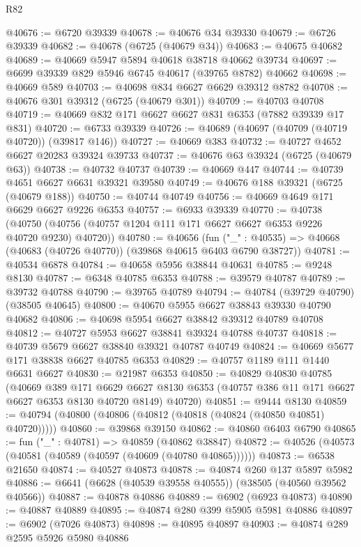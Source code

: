 \begin{lexlean}{R82}
\begin{coremodule}
@40676 := @6720 @39339
@40678 := @40676 @34 @39330
@40679 := @6726 @39339
@40682 := @40678 (@6725 (@40679 @34))
@40683 := @40675 @40682
@40689 := @40669 @5947 @5894 @40618 @38718 @40662 @39734
@40697 := @6699 @39339 @829 @5946 @6745 @40617 (@39765 @8782) @40662
@40698 := @40669 @589
@40703 := @40698 @834 @6627 @6629 @39312 @8782
@40708 := @40676 @301 @39312 (@6725 (@40679 @301))
@40709 := @40703 @40708
@40719 := @40669 @832 @171 @6627 @6627 @831 @6353 (@7882 @39339 @17 @831)
@40720 := @6733 @39339
@40726 := @40689 (@40697 (@40709 (@40719 @40720)) (@39817 @146))
@40727 := @40669 @383
@40732 := @40727 @4652 @6627 @20283 @39324 @39733
@40737 := @40676 @63 @39324 (@6725 (@40679 @63))
@40738 := @40732 @40737
@40739 := @40669 @447
@40744 := @40739 @4651 @6627 @6631 @39321 @39580
@40749 := @40676 @188 @39321 (@6725 (@40679 @188))
@40750 := @40744 @40749
@40756 := @40669 @4649 @171 @6629 @6627 @9226 @6353
@40757 := @6933 @39339
@40770 := @40738
    (@40750 (@40756 (@40757 @1204 @111 @171 @6627 @6627 @6353 @9226 @40720 @9230) @40720))
@40780 := @40656
    (fun ("_" : @40535) => @40668 (@40683 (@40726 @40770)) (@39868 @40615 @6403 @6790 @38727))
@40781 := @40534 @6878
@40784 := @40658 @5956 @38844 @40631
@40785 := @9248 @8130
@40787 := @6348 @40785 @6353
@40788 := @39579 @40787
@40789 := @39732 @40788
@40790 := @39765 @40789
@40794 := @40784 (@39729 @40790) (@38505 @40645)
@40800 := @40670 @5955 @6627 @38843 @39330 @40790 @40682
@40806 := @40698 @5954 @6627 @38842 @39312 @40789 @40708
@40812 := @40727 @5953 @6627 @38841 @39324 @40788 @40737
@40818 := @40739 @5679 @6627 @38840 @39321 @40787 @40749
@40824 := @40669 @5677 @171 @38838 @6627 @40785 @6353
@40829 := @40757 @1189 @111 @1440 @6631 @6627
@40830 := @21987 @6353
@40850 := @40829
    @40830
    @40785
    (@40669
      @389
      @171
      @6629
      @6627
      @8130
      @6353
      (@40757 @386 @11 @171 @6627 @6627 @6353 @8130 @40720 @8149)
      @40720)
@40851 := @9444 @8130
@40859 := @40794 (@40800 (@40806 (@40812 (@40818 (@40824 (@40850 @40851) @40720)))))
@40860 := @39868 @39150
@40862 := @40860 @6403 @6790
@40865 := fun ("_" : @40781) => @40859 (@40862 @38847)
@40872 := @40526 (@40573 (@40581 (@40589 (@40597 (@40609 (@40780 @40865))))))
@40873 := @6538 @21650
@40874 := @40527 @40873
@40878 := @40874 @260 @137 @5897 @5982
@40886 := @6641 (@6628 (@40539 @39558 @40555)) (@38505 (@40560 @39562 @40566))
@40887 := @40878 @40886
@40889 := @6902 (@6923 @40873)
@40890 := @40887 @40889
@40895 := @40874 @280 @399 @5905 @5981 @40886
@40897 := @6902 (@7026 @40873)
@40898 := @40895 @40897
@40903 := @40874 @289 @2595 @5926 @5980 @40886

\end{coremodule}
\end{lexlean}
